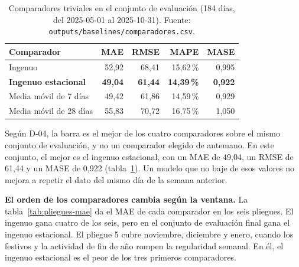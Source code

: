 \begin{table}[H]
\centering
\caption{Comparadores triviales en el conjunto de evaluación (184 días, del 2025-05-01 al 2025-10-31). Fuente: \texttt{outputs/\allowbreak{}baselines/\allowbreak{}comparadores.csv}.}\label{tab:comparadores}
\small
\begin{tabular}{@{}lrrrr@{}}
\toprule
\textbf{Comparador} & \textbf{MAE} & \textbf{RMSE} & \textbf{MAPE} & \textbf{MASE} \\
\midrule
Ingenuo & 52,92 & 68,41 & 15,62\,\% & 0,995 \\
\textbf{Ingenuo estacional} & \textbf{49,04} & \textbf{61,44} & \textbf{14,39\,\%} & \textbf{0,922} \\
Media móvil de 7 días & 49,42 & 61,86 & 14,59\,\% & 0,929 \\
Media móvil de 28 días & 55,83 & 70,72 & 16,75\,\% & 1,050 \\
\bottomrule
\end{tabular}
\end{table}

Según D-04, la barra es el mejor de los cuatro comparadores sobre el mismo conjunto de evaluación, y no un comparador elegido de antemano. En este conjunto, el mejor es el ingenuo estacional, con un MAE de 49,04, un RMSE de 61,44 y un MASE de 0,922 (tabla~\ref{tab:comparadores}). Un modelo que no baje de esos valores no mejora a repetir el dato del mismo día de la semana anterior.

\textbf{El orden de los comparadores cambia según la ventana.} La tabla~\ref{tab:pliegues-mae} da el MAE de cada comparador en los seis pliegues. El ingenuo gana cuatro de los seis, pero en el conjunto de evaluación final gana el ingenuo estacional. El pliegue 5 cubre noviembre, diciembre y enero, cuando los festivos y la actividad de fin de año rompen la regularidad semanal. En él, el ingenuo estacional es el peor de los tres primeros comparadores.

